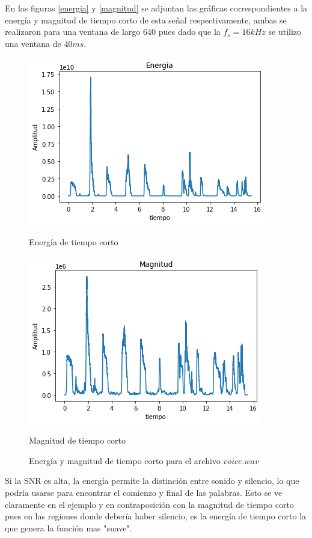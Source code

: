 \documentclass[a4paper]{article}
\begin{document}
\newline
En las figuras \ref{energia} y \ref{magnitud} se adjuntan las gráficas correspondientes a la energía y magnitud de tiempo corto de esta señal respectivamente, ambas se realizaron para una ventana de largo 640 pues dado que la $f_s = 16kHz$ se utilizo una ventana de $40ms$. 
\begin{figure}[h]
\begin{minipage}[b]{0.5\linewidth}
\centering
\includegraphics[width=\linewidth]{energia.png}
\caption{Energía de tiempo corto }
\label{energia}
\end{minipage}
\hspace{0.5cm}
\begin{minipage}[b]{0.5\linewidth}
\centering
\includegraphics[width=\linewidth]{magnitud.png}
\caption{Magnitud de tiempo corto}
\label{magnitud}
\end{minipage}
\caption{Energía y magnitud de tiempo corto para el archivo $voice.wav$}
\label{eym}
\end{figure}
Si la SNR es alta, la energía permite la distinción entre sonido y silencio, lo que podría usarse para encontrar el comienzo y final de las palabras. Esto se ve claramente en el ejemplo y en contraposición con la magnitud de tiempo corto pues en las regiones donde debería haber silencio, es la energía de tiempo corto la que genera la función mas "suave".
\end{document}
